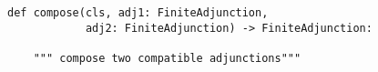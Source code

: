 \begin{verbatim}
def compose(cls, adj1: FiniteAdjunction,
            adj2: FiniteAdjunction) -> FiniteAdjunction:

    """ compose two compatible adjunctions"""
\end{verbatim}